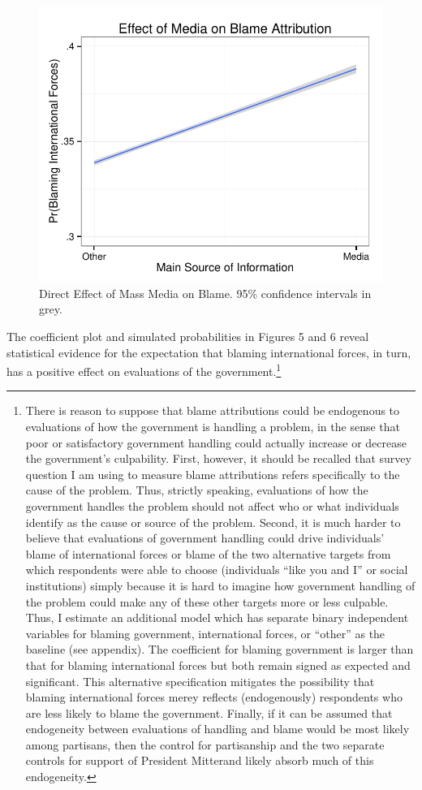 \documentclass[12pt]{report}
\begin{document}
\begin{center}
\begin{figure}
\includegraphics{article1_media_blame_effect}
\caption{Direct Effect of Mass Media on Blame. 95\% confidence intervals in grey.}
\end{figure}
\end{center}

The coefficient plot and simulated probabilities in Figures 5 and 6 reveal statistical evidence for
the expectation that blaming international forces, in turn, has a positive effect on evaluations of
the government.\footnote{There is reason to suppose that blame attributions could be endogenous to
evaluations of how the government is handling a problem, in the sense that poor or satisfactory
government handling could actually increase or decrease the government's culpability. First,
however, it should be recalled that survey question I am using to measure blame attributions refers
specifically to the cause of the problem. Thus, strictly speaking, evaluations of how the government
handles the problem should not affect who or what individuals identify as the cause or source of the
problem. Second, it is much harder to believe that evaluations of government handling could drive
individuals' blame of international forces or blame of the two alternative targets from which
respondents were able to choose (individuals ``like you and I'' or social institutions) simply
because it is hard to imagine how government handling of the problem could make any of these other
targets more or less culpable. Thus, I estimate an additional model which has separate binary
independent variables for blaming government, international forces, or ``other'' as the baseline
(see appendix). The coefficient for blaming government is larger than that for blaming
international forces but both remain signed as expected and significant. This alternative
specification mitigates the possibility that blaming international forces merey reflects
(endogenously) respondents who are less likely to blame the government. Finally, if it can be
assumed that endogeneity between evaluations of handling and blame would be most likely among
partisans, then the control for partisanship and the two separate controls for support of President
Mitterand likely absorb much of this endogeneity.}
\end{document}
